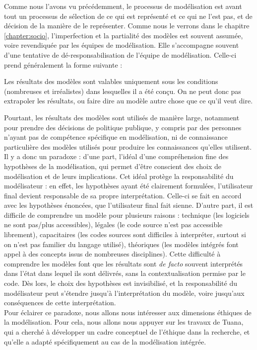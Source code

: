Comme nous l'avons vu précédemment, le processus de modélisation est avant tout un processus de sélection de ce qui est représenté et ce qui ne l'est pas, et de décision de la manière de le représenter. Comme nous le verrons dans le chapitre \ref{chapter:socio}, l'imperfection et la partialité des modèles est souvent assumée, voire revendiquée par les équipes de modélisation. Elle s'accompagne souvent d'une tentative de dé-responsabilisation de l'équipe de modélisation. Celle-ci prend généralement la forme suivante : 

\begin{displayquote}
    Les résultats des modèles sont valables uniquement sous les conditions (nombreuses et irréalistes) dans lesquelles il a été conçu. On ne peut donc pas extrapoler les résultats, ou faire dire au modèle autre chose que ce qu'il veut dire. 
\end{displayquote}
Pourtant, les résultats des modèles sont utilisés de manière large, notamment pour prendre des décisions de politique publique, y compris par des personnes n'ayant pas de compétence spécifique en modélisation, ni de connaissance particulière des modèles utilisés pour produire les connaissances qu'elles utilisent. Il y a donc un paradoxe : d'une part, l'idéal d'une compréhension fine des hypothèses de la modélisation, qui permet d'être conscient des choix de modélisation et de leurs implications. Cet idéal protège la responsabilité du modélisateur : en effet, les hypothèses ayant été clairement formulées, l'utilisateur final devient responsable de sa propre interprétation. Celle-ci se fait en accord avec les hypothèses énoncées, que l'utilisateur final fait sienne. D'autre part, il est difficile de comprendre un modèle pour plusieurs raisons : technique (les logiciels ne sont pas/plus accessibles), légales (le code source n'est pas accessible librement), capacitaires (les codes sources sont difficiles à interpréter, surtout si on n'est pas familier du langage utilisé), théoriques (les modèles intégrés font appel à des concepts issus de nombreuses disciplines). Cette difficulté à comprendre les modèles font que les résultats sont \textit{de facto} souvent interprétés dans l'état dans lequel ils sont délivrés, sans la contextualisation permise par le code. Dès lors, le choix des hypothèses est invisibilisé, et la responsabilité du modélisateur peut s'étendre jusqu'à l'interprétation du modèle, voire jusqu'aux conséquences de cette interprétation. \\

Pour éclairer ce paradoxe, nous allons nous intéresser aux dimensions éthiques de la modélisation. Pour cela, nous allons nous appuyer sur les travaux de Tuana, qui a cherché à développer un cadre conceptuel de l'éthique dans la recherche, et qu'elle a adapté spécifiquement au cas de la modélisation intégrée. \\

